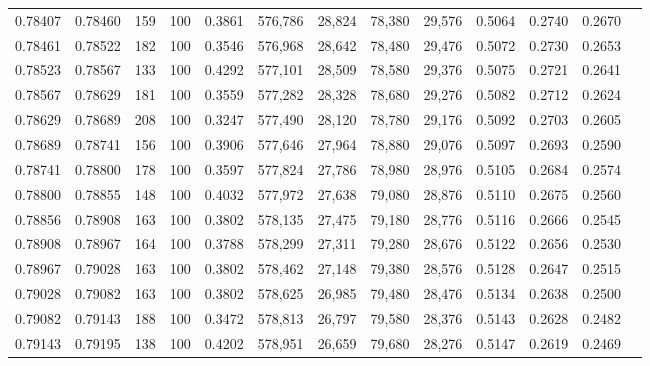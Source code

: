 \begin{tabular}{rrrrrrrrrrrrr}
0.78407 & 0.78460 &   159 & 100 &                                     0.3861 & 576,786 &  28,824 &  78,380 &  29,576 & 0.5064 & 0.2740 & 0.2670 \\
0.78461 & 0.78522 &   182 & 100 &                                     0.3546 & 576,968 &  28,642 &  78,480 &  29,476 & 0.5072 & 0.2730 & 0.2653 \\
0.78523 & 0.78567 &   133 & 100 &                                     0.4292 & 577,101 &  28,509 &  78,580 &  29,376 & 0.5075 & 0.2721 & 0.2641 \\
0.78567 & 0.78629 &   181 & 100 &                                     0.3559 & 577,282 &  28,328 &  78,680 &  29,276 & 0.5082 & 0.2712 & 0.2624 \\
0.78629 & 0.78689 &   208 & 100 &                                     0.3247 & 577,490 &  28,120 &  78,780 &  29,176 & 0.5092 & 0.2703 & 0.2605 \\
0.78689 & 0.78741 &   156 & 100 &                                     0.3906 & 577,646 &  27,964 &  78,880 &  29,076 & 0.5097 & 0.2693 & 0.2590 \\
0.78741 & 0.78800 &   178 & 100 &                                     0.3597 & 577,824 &  27,786 &  78,980 &  28,976 & 0.5105 & 0.2684 & 0.2574 \\
0.78800 & 0.78855 &   148 & 100 &                                     0.4032 & 577,972 &  27,638 &  79,080 &  28,876 & 0.5110 & 0.2675 & 0.2560 \\
0.78856 & 0.78908 &   163 & 100 &                                     0.3802 & 578,135 &  27,475 &  79,180 &  28,776 & 0.5116 & 0.2666 & 0.2545 \\
0.78908 & 0.78967 &   164 & 100 &                                     0.3788 & 578,299 &  27,311 &  79,280 &  28,676 & 0.5122 & 0.2656 & 0.2530 \\
0.78967 & 0.79028 &   163 & 100 &                                     0.3802 & 578,462 &  27,148 &  79,380 &  28,576 & 0.5128 & 0.2647 & 0.2515 \\
0.79028 & 0.79082 &   163 & 100 &                                     0.3802 & 578,625 &  26,985 &  79,480 &  28,476 & 0.5134 & 0.2638 & 0.2500 \\
0.79082 & 0.79143 &   188 & 100 &                                     0.3472 & 578,813 &  26,797 &  79,580 &  28,376 & 0.5143 & 0.2628 & 0.2482 \\
0.79143 & 0.79195 &   138 & 100 &                                     0.4202 & 578,951 &  26,659 &  79,680 &  28,276 & 0.5147 & 0.2619 & 0.2469 \\

\end{tabular}
